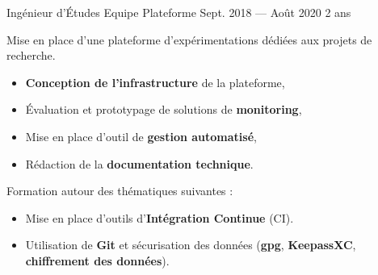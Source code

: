 \jobposition%
{Ingénieur d’Études}%
{Equipe Plateforme}
{Sept. 2018 --- Août 2020}%
{2 ans}%
{
	Mise en place d'une plateforme d'expérimentations dédiées aux projets de
	recherche.

	\begin{itemize}
		\item \textbf{Conception de l'infrastructure} de la plateforme,
		\item Évaluation et prototypage de solutions de \textbf{monitoring},
		\item Mise en place d’outil de \textbf{gestion automatisé},
		\item Rédaction de la \textbf{documentation technique}.
	\end{itemize}

	Formation autour des thématiques suivantes :

	\begin{itemize}
		\item Mise en place d’outils d’\textbf{Intégration Continue} (CI).
		\item Utilisation de \textbf{Git} et sécurisation des données
		      (\textbf{gpg}, \textbf{KeepassXC}, \textbf{chiffrement des données}).
	\end{itemize}


}
